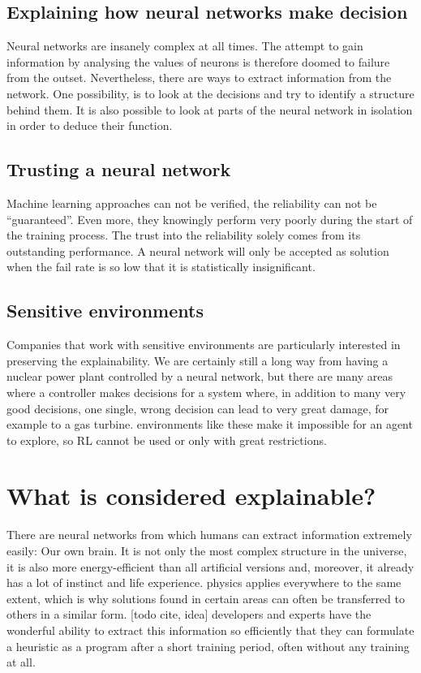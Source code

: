 \subsection{Explaining how neural networks make decision}

Neural networks are insanely complex at all times. The attempt to gain information by analysing the values of neurons is therefore doomed to failure from the outset. Nevertheless, there are ways to extract information from the network. One possibility, is to look at the decisions and try to identify a structure behind them. It is also possible to look at parts of the neural network in isolation in order to deduce their function.

\subsection{Trusting a neural network}


Machine learning approaches can not be verified, the reliability can not be ``guaranteed''. Even more, they knowingly perform very poorly during the start of the training process. The trust into the reliability solely comes from its outstanding performance. A neural network will only be accepted as solution when the fail rate is so low that it is statistically insignificant. 

\subsection{Sensitive environments}

Companies that work with sensitive environments are particularly interested in preserving the explainability. We are certainly still a long way from having a nuclear power plant controlled by a neural network, but there are many areas where a controller makes decisions for a system where, in addition to many very good decisions, one single, wrong decision can lead to very great damage, for example to a gas turbine.
environments like these make it impossible for an agent to explore, so RL cannot be used or only with great restrictions.





\section{What is considered explainable?}

There are neural networks from which humans can extract information extremely easily: Our own brain. It is not only the most complex structure in the universe, it is also more energy-efficient than all artificial versions and, moreover, it already has a lot of instinct and life experience. physics applies everywhere to the same extent, which is why solutions found in certain areas can often be transferred to others in a similar form. [todo cite, idea] developers and experts have the wonderful ability to extract this information so efficiently that they can formulate a heuristic as a program after a short training period, often without any training at all.

